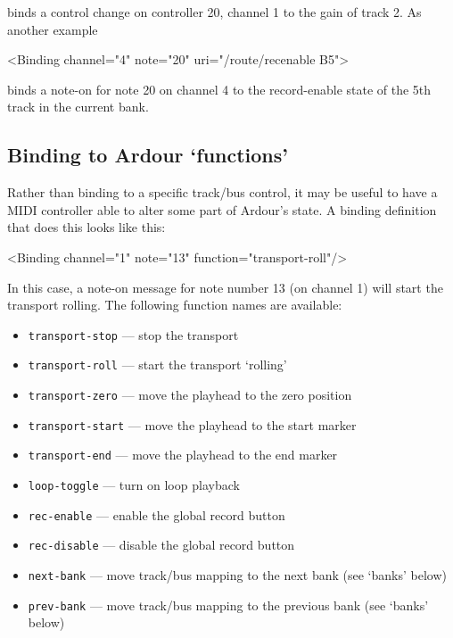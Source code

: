 \documentclass[10pt,a4paper]{book}
\begin{document}
{binds a control change on controller 20, channel 1 to the gain of track 2.  As another example

\begin{listing}
<Binding channel="4" note="20" uri="/route/recenable B5">
\end{listing}

binds a note-on for note 20 on channel 4 to the record-enable state of
the 5th track in the current bank.



\subsection{Binding to Ardour `functions'}

Rather than binding to a specific track/bus control, it may be useful
to have a MIDI controller able to alter some part of Ardour's state. A
binding definition that does this looks like this:

\begin{listing}
<Binding channel="1" note="13" function="transport-roll"/>
\end{listing}

In this case, a note-on message for note number 13 (on channel 1) will
start the transport rolling. The following function names are
available:

\begin{itemize}
\item \texttt{transport-stop} --- stop the transport 
\item \texttt{transport-roll} --- start the transport `rolling'
\item \texttt{transport-zero} --- move the playhead to the zero position 
\item \texttt{transport-start} --- move the playhead to the start marker 
\item \texttt{transport-end} --- move the playhead to the end marker 
\item \texttt{loop-toggle} --- turn on loop playback 
\item \texttt{rec-enable} --- enable the global record button 
\item \texttt{rec-disable} --- disable the global record button 
\item \texttt{next-bank} --- move track/bus mapping to the next bank (see `banks' below) 
\item \texttt{prev-bank} --- move track/bus mapping to the previous bank (see `banks' below) 
\end{itemize}

}
\end{document}
